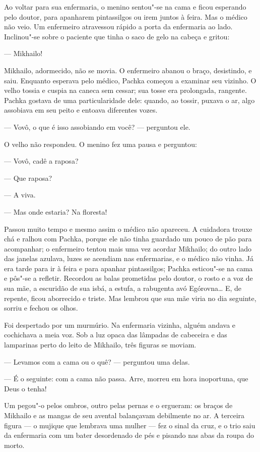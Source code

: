 Ao voltar para sua enfermaria, o menino sentou"-se na cama e ficou
esperando pelo doutor, para apanharem pintassilgos ou irem juntos à
feira. Mas o médico não veio. Um enfermeiro atravessou rápido a porta da
enfermaria ao lado. Inclinou"-se sobre o paciente que tinha o saco de
gelo na cabeça e gritou:

--- Mikhailo!

Mikhailo, adormecido, não se movia. O enfermeiro abanou o braço,
desistindo, e saiu. Enquanto esperava pelo médico, Pachka começou a
examinar seu vizinho. O velho tossia e cuspia na caneca sem cessar; sua
tosse era prolongada, rangente. Pachka gostava de uma particularidade
dele: quando, ao tossir, puxava o ar, algo assobiava em seu peito e
entoava diferentes vozes.

--- Vovô, o que é isso assobiando em você? --- perguntou ele.

O velho não respondeu. O menino fez uma pausa e perguntou:

--- Vovô, cadê a raposa?

--- Que raposa?

--- A viva.

--- Mas onde estaria? Na floresta!

Passou muito tempo e mesmo assim o médico não apareceu. A cuidadora
trouxe chá e ralhou com Pachka, porque ele não tinha guardado um pouco
de pão para acompanhar; o enfermeiro tentou mais uma vez acordar
Mikhailo; do outro lado das janelas azulava, luzes se acendiam nas
enfermarias, e o médico não vinha. Já era tarde para ir à feira e para
apanhar pintassilgos; Pachka esticou"-se na cama e pôs"-se a refletir.
Recordou as balas prometidas pelo doutor, o rosto e a voz de sua mãe, a
escuridão de sua isbá, a estufa, a rabugenta avó Egórovna\ldots{} E, de
repente, ficou aborrecido e triste. Mas lembrou que sua mãe viria no dia
seguinte, sorriu e fechou os olhos.

Foi despertado por um murmúrio. Na enfermaria vizinha, alguém andava e
cochichava a meia voz. Sob a luz opaca das lâmpadas de cabeceira e das
lamparinas perto do leito de Mikhailo, três figuras se moviam.

--- Levamos com a cama ou o quê? --- perguntou uma delas.

--- É o seguinte: com a cama não passa. Arre, morreu em hora inoportuna,
que Deus o tenha!

Um pegou"-o pelos ombros, outro pelas pernas e o ergueram: os braços de
Mikhailo e as mangas de seu avental balançavam debilmente no ar. A
terceira figura --- o mujique que lembrava uma mulher --- fez o sinal da
cruz, e o trio saiu da enfermaria com um bater desordenado de pés e
pisando nas abas da roupa do morto.

